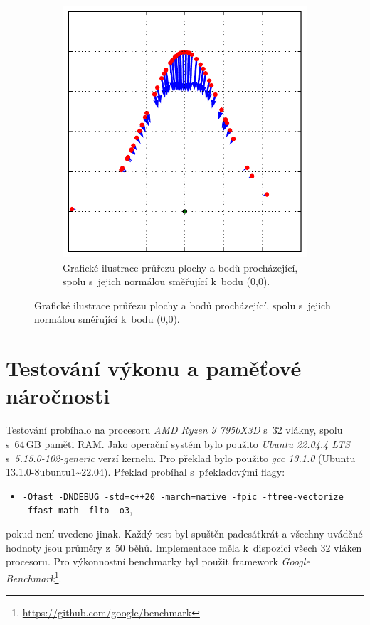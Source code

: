 \begin{figure}
\begin{subfigure}[t]{0.5\columnwidth}
\includegraphics[scale=0.49]{obrazky-figures/knn_norm/points_2d_normals_ilustration.pdf}
    \caption{Grafické ilustrace průřezu plochy a bodů procházející, spolu s~jejich normálou směřující k~bodu (0,0).}
\end{subfigure}

\end{figure}

\subsubsection{}



\section{Testování výkonu a paměťové náročnosti}
\label{vykon}


Testování probíhalo na procesoru \emph{AMD Ryzen 9 7950X3D} s~32 vlákny, spolu s~64\,GB paměti RAM. Jako operační systém bylo použito \emph{Ubuntu 22.04.4 LTS} s~\emph{5.15.0-102-generic} verzí kernelu. Pro překlad bylo použito \emph{gcc 13.1.0} (Ubuntu 13.1.0-8ubuntu1\textasciitilde{}22.04). Překlad probíhal s~překladovými flagy:

\begin{itemize}
    \item \texttt{-Ofast -DNDEBUG -std=c++20 -march=native -fpic -ftree-vectorize \\ 
    -ffast-math -flto -o3},
\end{itemize}
pokud není uvedeno jinak. Každý test byl spuštěn padesátkrát a všechny uváděné hodnoty jsou průměry z~50 běhů. Implementace měla k~dispozici všech 32 vláken procesoru. Pro výkonnostní benchmarky byl použit framework \emph{Google Benchmark}\footnote{\url{https://github.com/google/benchmark}}.


